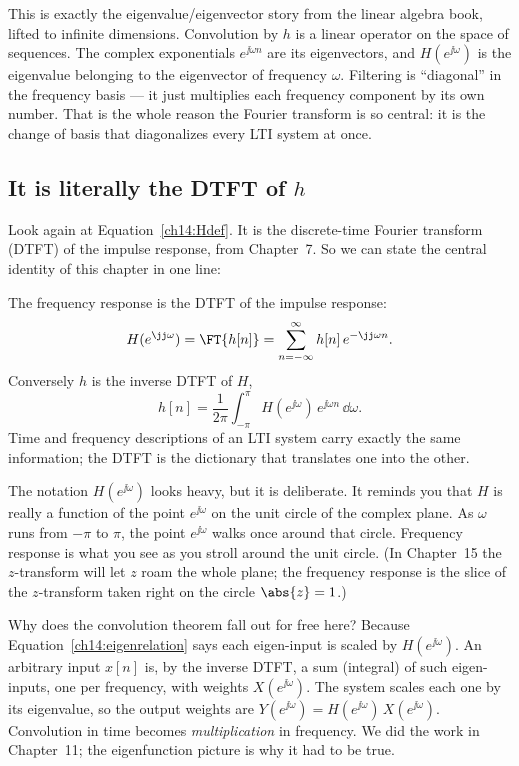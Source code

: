 \begin{connectionbox}
This is exactly the eigenvalue/eigenvector story from the linear algebra book,
lifted to infinite dimensions. Convolution by $h$ is a linear operator on the
space of sequences. The complex exponentials $e^{\jj\omega n}$ are its
eigenvectors, and $H(e^{\jj\omega})$ is the eigenvalue belonging to the
eigenvector of frequency $\omega$. Filtering is ``diagonal'' in the frequency
basis --- it just multiplies each frequency component by its own number. That is
the whole reason the Fourier transform is so central: it is the change of basis
that diagonalizes every LTI system at once.
\end{connectionbox}

\subsection{It is literally the DTFT of \texorpdfstring{$h$}{h}}

Look again at Equation~\eqref{ch14:Hdef}. It is the discrete-time Fourier
transform (DTFT) of the impulse response, from Chapter~7. So we can state the
central identity of this chapter in one line:

\begin{formalbox}
The frequency response is the DTFT of the impulse response:
\[
  H(e^{\jj\omega}) = \FT\{h[n]\} = \sum_{n=-\infty}^{\infty} h[n]\, e^{-\jj\omega n}.
\]
Conversely $h$ is the inverse DTFT of $H$,
\[
  h[n] = \frac{1}{2\pi}\int_{-\pi}^{\pi} H(e^{\jj\omega})\, e^{\jj\omega n}\,\dd\omega .
\]
Time and frequency descriptions of an LTI system carry exactly the same
information; the DTFT is the dictionary that translates one into the other.
\end{formalbox}

The notation $H(e^{\jj\omega})$ looks heavy, but it is deliberate. It reminds
you that $H$ is really a function of the point $e^{\jj\omega}$ on the unit
circle of the complex plane. As $\omega$ runs from $-\pi$ to $\pi$, the point
$e^{\jj\omega}$ walks once around that circle. Frequency response is what you
see as you stroll around the unit circle. (In Chapter~15 the $z$-transform will
let $z$ roam the whole plane; the frequency response is the slice of the
$z$-transform taken right on the circle $\abs{z}=1$.)

\begin{whybox}
Why does the convolution theorem fall out for free here? Because
Equation~\eqref{ch14:eigenrelation} says each eigen-input is scaled by
$H(e^{\jj\omega})$. An arbitrary input $x[n]$ is, by the inverse DTFT, a sum
(integral) of such eigen-inputs, one per frequency, with weights
$X(e^{\jj\omega})$. The system scales each one by its eigenvalue, so the output
weights are $Y(e^{\jj\omega}) = H(e^{\jj\omega})\,X(e^{\jj\omega})$.
Convolution in time becomes \emph{multiplication} in frequency. We did the work
in Chapter~11; the eigenfunction picture is why it had to be true.
\end{whybox}

